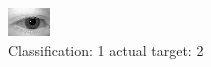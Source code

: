 \begin{figure}[h!]
\begin{center}
\includegraphics[width=0.60\columnwidth]{figures/ID380_class_1_target_2.png}
\end{center}
\caption{ Classification: 1 actual target: 2}
\label{fig:ID380_class_1_target_2}
\end{figure}
